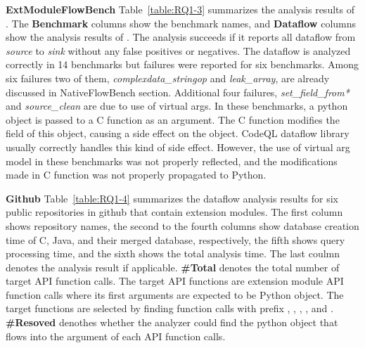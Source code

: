 


\textbf{ExtModuleFlowBench}
Table~\ref{table:RQ1-3} summarizes the analysis results of \ours.
The {\bf Benchmark} columns show the benchmark names,
and {\bf Dataflow} columns show the analysis results of \ours.
The analysis succeeds if it reports all dataflow from {\it source} to {\it sink} without any false positives or negatives.
The dataflow is analyzed correctly in 14
benchmarks but failures were reported for six benchmarks.
Among six failures two of them,
{\it complexdata\_stringop} and {\it leak\_array},
are already discussed in NativeFlowBench section.
Additional four failures, {\it set\_field\_from*} and {\it source\_clean}
are due to use of virtual args. In these benchmarks, a python object is
passed to a C function as an argument. The C function modifies the field
of this object, causing a side effect on the object. CodeQL dataflow library
usually correctly handles this kind of side effect. However, the use of virtual arg model
in these benchmarks was not properly reflected, and the modifications made in C function
was not properly propagated to Python.



\textbf{Github}
Table~\ref{table:RQ1-4} summarizes the dataflow analysis results for six public
repositories in github that contain extension modules.  The first column shows
repository names, the second to the fourth columns show database creation time
of C, Java, and their merged database, respectively, the fifth shows query
processing time, and the sixth shows the total analysis time.  The last coulmn
denotes the analysis result if applicable. {\bf \#Total} denotes the total
number of target API function calls. The target API functions are extension
module API function calls where its first arguments are expected to be Python
object.  The target functions are selected by finding function calls with
prefix , , ,
, and .  {\bf \#Resoved} denothes whether the
analyzer could find the python object that flows into the argument of each API
function calls.

